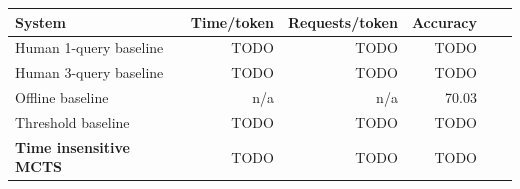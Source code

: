 \begin{center}
\begin{tabular}{ | l | r | r | r | r | r | }
    \hline
    \textbf{System} & \textbf{Time/token} & \textbf{Requests/token} & \textbf{Accuracy} \\ \hline
    Human 1-query baseline & TODO & TODO & TODO \\ \hline
    Human 3-query baseline & TODO & TODO & TODO \\ \hline
    Offline baseline & n/a & n/a & 70.03 \\ \hline
    Threshold baseline & TODO & TODO & TODO \\ \hline
    \textbf{Time insensitive MCTS} & TODO & TODO & TODO\\ \hline
\end{tabular}
\end{center}


